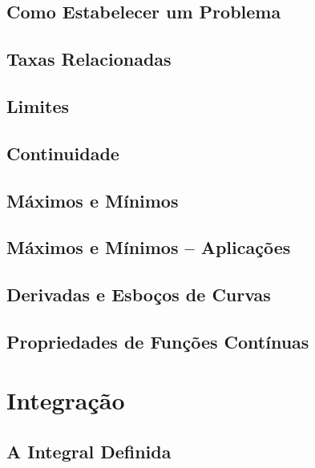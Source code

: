 \documentclass{svmono}
\begin{document}
\section{Como Estabelecer um Problema}
\label{sec:howtoproblem}

\section{Taxas Relacionadas}
\label{sec:relatedrates}

\section{Limites}
\label{sec:limits}

\section{Continuidade}
\label{sec:continuity}

\section{Máximos e Mínimos}
\label{sec:maxmin}

\section{Máximos e Mínimos -- Aplicações}
\label{sec:maxminappl}

\section{Derivadas e Esboços de Curvas}
\label{sec:derivsketch}

\section{Propriedades de Funções Contínuas}
\label{sec:propcont}

\chapterproblems

\chapter{Integração}
\label{chp:integration}

\section{A Integral Definida}
\label{sec:definiteint}
\end{document}
